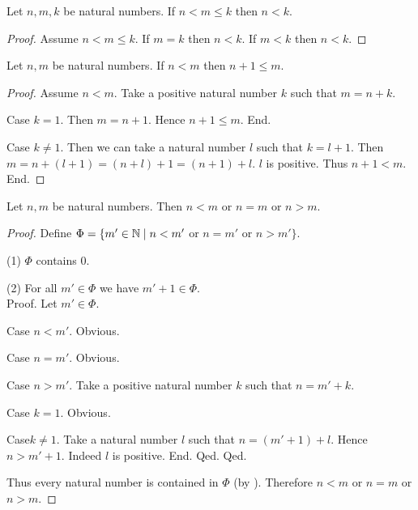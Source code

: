 \documentclass[10pt]{article}
\begin{document}
  \begin{forthel}
    \begin{proposition}
      Let $n, m, k$ be natural numbers.
      If $n < m \leq k$ then $n < k$.
    \end{proposition}
    \begin{proof}
      Assume $n < m \leq k$.
      If $m = k$ then $n < k$.
      If $m < k$ then $n < k$.
    \end{proof}
  \end{forthel}

  \begin{forthel}
    \begin{proposition}
      Let $n, m$ be natural numbers.
      If $n < m$ then $n + 1 \leq m$.
    \end{proposition}
    \begin{proof}
      Assume $n < m$.
      Take a positive natural number $k$ such that $m = n + k$.

      Case $k = 1$.
        Then $m = n + 1$.
        Hence $n + 1 \leq m$.
      End.

      Case $k \neq 1$.
        Then we can take a natural number $l$ such that $k = l + 1$.
        Then $m
          = n + (l + 1)
          = (n + l) + 1
          = (n + 1) + l$.
        $l$ is positive.
        Thus $n + 1 < m$.
      End.
    \end{proof}
  \end{forthel}

  \begin{forthel}
    \begin{proposition}
      Let $n, m$ be natural numbers.
      Then $n < m$ or $n = m$ or $n > m$.
    \end{proposition}
    \begin{proof}
      Define $\Phi = \{ m' \in \mathbb{N} \mid n < m'$ or $n = m'$ or $n > m' \}$.

      (1) $\Phi$ contains $0$.

      (2) For all $m' \in \Phi$ we have $m' + 1 \in \Phi$. \\
      Proof.
        Let $m' \in \Phi$.

        Case $n < m'$. Obvious.

        Case $n = m'$. Obvious.

        Case $n > m'$.
          Take a positive natural number $k$ such that $n = m' + k$.

          Case $k = 1$. Obvious.

          Case$k \neq 1$.
            Take a natural number $l$ such that $n = (m' + 1) + l$.
            Hence $n > m' + 1$.
            Indeed $l$ is positive.
          End.
        Qed.
      Qed.

      Thus every natural number is contained in $\Phi$ (by ).
      Therefore $n < m$ or $n = m$ or $n > m$.
    \end{proof}
  \end{forthel}
\end{document}
